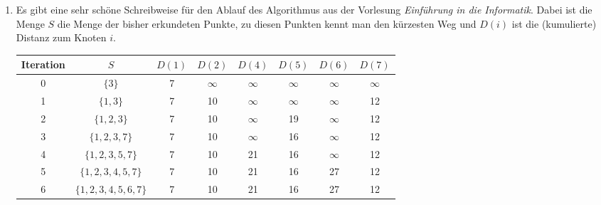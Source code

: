\documentclass{article}
\begin{document}
\begin{enumerate}[label=(\alph*)]
\begin{center}
		\end{center}
		\item Es gibt eine sehr schöne Schreibweise für den Ablauf des Algorithmus aus der Vorlesung \textit{Einführung in die Informatik}. Dabei ist die Menge $S$ die Menge der bisher erkundeten Punkte, zu diesen Punkten kennt man den kürzesten Weg und $D(i)$ ist die (kumulierte) Distanz zum Knoten $i$.
		\begin{center}
			\begin{tabular}{c|c|cccccc}
				Iteration & $S$ & $D(1)$ & $D(2)$ & $D(4)$ & $D(5)$ & $D(6)$ & $D(7)$ \\
				\hline
				0 & $\{3\}$ & 7 & $\infty$ & $\infty$ & $\infty$ & $\infty$ & $\infty$ \\
				1 & $\{1,3\}$ & 7 & 10 & $\infty$ & $\infty$ & $\infty$ & 12 \\
				2 & $\{1,2,3\}$ & 7 & 10 & $\infty$ & 19 & $\infty$ & 12 \\
				3 & $\{1,2,3,7\}$ & 7 & 10 & $\infty$ & 16 & $\infty$ & 12 \\
				4 & $\{1,2,3,5,7\}$ & 7 & 10 & 21 & 16 & $\infty$ & 12 \\
				5 & $\{1,2,3,4,5,7\}$ & 7 & 10 & 21 & 16 & 27 & 12 \\
				6 & $\{1,2,3,4,5,6,7\}$ & 7 & 10 & 21 & 16 & 27 & 12
			\end{tabular}
		\end{center}
	\end{enumerate}
	
\end{document}
